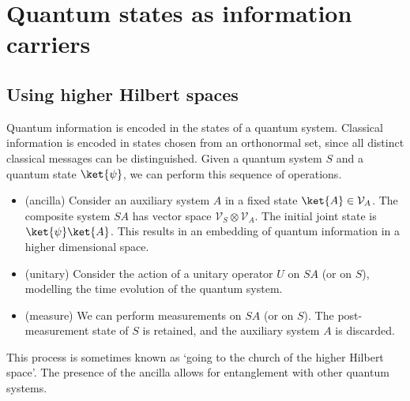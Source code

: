 \section{Quantum states as information carriers}

\subsection{Using higher Hilbert spaces}
Quantum information is encoded in the states of a quantum system.
Classical information is encoded in states chosen from an orthonormal set, since all distinct classical messages can be distinguished.
Given a quantum system $S$ and a quantum state $\ket{\psi}$, we can perform this sequence of operations.
\begin{itemize}
    \item (ancilla) Consider an auxiliary system $A$ in a fixed state $\ket{A} \in \mathcal V_A$.
    The composite system $SA$ has vector space $\mathcal V_S \otimes \mathcal V_A$.
    The initial joint state is $\ket{\psi}\ket{A}$.
    This results in an embedding of quantum information in a higher dimensional space.
    \item (unitary) Consider the action of a unitary operator $U$ on $SA$ (or on $S$), modelling the time evolution of the quantum system.
    \item (measure) We can perform measurements on $SA$ (or on $S$).
    The post-measurement state of $S$ is retained, and the auxiliary system $A$ is discarded.
\end{itemize}
This process is sometimes known as `going to the church of the higher Hilbert space'.
The presence of the ancilla allows for entanglement with other quantum systems.

